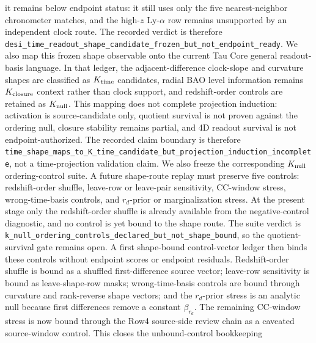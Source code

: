 \documentclass[11pt]{article}
\begin{document}
it remains below endpoint status: it still uses only the five nearest-neighbor
chronometer matches, and the high-\(z\) Ly-\(\alpha\) row remains unsupported by
an independent clock route.  The recorded verdict is therefore
\texttt{desi\_\allowbreak{}time\_\allowbreak{}readout\_\allowbreak{}shape\_\allowbreak{}candidate\_\allowbreak{}frozen\_\allowbreak{}but\_\allowbreak{}not\_\allowbreak{}endpoint\_\allowbreak{}ready}.
We also map this frozen shape observable onto the current Tau Core general
readout-basis language.  In that ledger, the adjacent-difference clock-slope
and curvature shapes are classified as \(K_{\rm time}\) candidates, radial BAO
level information remains \(K_{\rm closure}\) context rather than clock
support, and redshift-order controls are retained as \(K_{\rm null}\).  This
mapping does not complete projection induction: activation is source-candidate
only, quotient survival is not proven against the ordering null, closure
stability remains partial, and 4D readout survival is not endpoint-authorized.
The recorded claim boundary is therefore
\texttt{time\_\allowbreak{}shape\_\allowbreak{}maps\_\allowbreak{}to\_\allowbreak{}K\_\allowbreak{}time\_\allowbreak{}candidate\_\allowbreak{}but\_\allowbreak{}projection\_\allowbreak{}induction\_\allowbreak{}incomplete},
not a time-projection validation claim.
We also freeze the corresponding \(K_{\rm null}\) ordering-control suite.  A
future shape-route replay must preserve five controls:
redshift-order shuffle, leave-row or leave-pair sensitivity, CC-window stress,
wrong-time-basis controls, and \(r_d\)-prior or marginalization stress.  At the
present stage only the redshift-order shuffle is already available from the
negative-control diagnostic, and no control is yet bound to the shape route.
The suite verdict is
\texttt{k\_\allowbreak{}null\_\allowbreak{}ordering\_\allowbreak{}controls\_\allowbreak{}declared\_\allowbreak{}but\_\allowbreak{}not\_\allowbreak{}shape\_\allowbreak{}bound}, so the
quotient-survival gate remains open.
A first shape-bound control-vector ledger then binds these controls without
endpoint scores or endpoint residuals.  Redshift-order shuffle is bound as a
shuffled first-difference source vector; leave-row sensitivity is bound as
leave-shape-row masks; wrong-time-basis controls are bound through curvature and
rank-reverse shape vectors; and the \(r_d\)-prior stress is an analytic null
because first differences remove a constant \(\beta_{r_d}\).  The remaining
CC-window stress is now bound through the Row4 source-side review chain as a
caveated source-window control.  This closes the unbound-control bookkeeping
\end{document}
